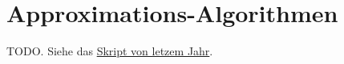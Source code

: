 \section{Approximations-Algorithmen}

TODO.
Siehe das \href{https://github.com/eth-cs-student-summaries/Algorithmik-fuer-Schwere-Probleme/}{Skript von letzem Jahr}.
